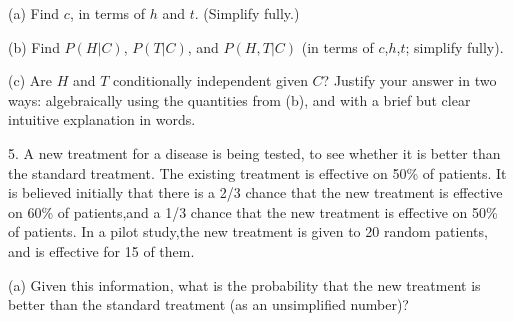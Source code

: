 \documentclass{article}
\begin{document}
(a) Find $c$, in terms of $h$ and $t$. (Simplify fully.)


(b) Find $P(H|C)$, $P(T|C)$, and $P(H,T|C)$ (in terms of $c$,$h$,$t$; simplify fully).


(c) Are $H$ and $T$ conditionally independent given $C$?  Justify your answer in two ways: algebraically using the quantities from (b), and with a brief but clear intuitive explanation in words.


\newpage

5. A new treatment for a disease is being tested, to see whether it is better than the standard treatment.  The existing treatment is effective on 50\% of patients.  It is believed initially that there is a 2/3 chance that the new treatment is effective on 60\% of patients,and a 1/3 chance that the new treatment is effective on 50\% of patients.  In a pilot study,the new treatment is given to 20 random patients, and is effective for 15 of them.

(a) Given  this  information,  what  is  the  probability  that  the  new  treatment  is  better than the standard treatment (as an unsimplified number)?

\end{document}
